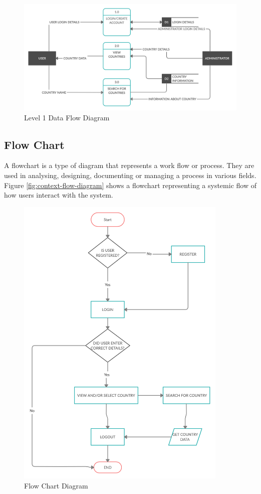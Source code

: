 \documentclass[twoside, a4paper, 12pt]{report}
\begin{document}
\begin{figure} [h]
	\centering
	\includegraphics[width=1.0\textwidth]{DFD.png}
	\caption{Level 1 Data Flow Diagram}
	\label{fig:level-1-data-flow-diagram}
\end{figure}

\subsection{Flow Chart}
A flowchart is a type of diagram that represents a work flow or process. They are used in analysing, designing, documenting or managing a process in various fields.\\
\indent
Figure \ref{fig:context-flow-diagram} shows a flowchart representing a systemic flow of how users interact with the system.

\begin{figure}
	\centering
	\includegraphics[width=0.9\textwidth]{flowchart.png}
	\caption{Flow Chart Diagram}
	\label{fig:flow-chart-diagram}
\end{figure}
\end{document}
